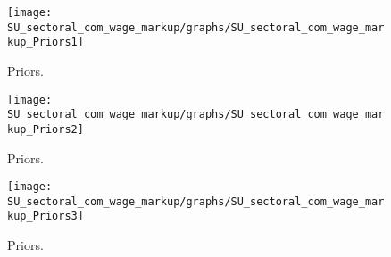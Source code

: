  
\begin{figure}[H]
\centering
\texttt{[image: SU\_sectoral\_com\_wage\_markup/graphs/SU\_sectoral\_com\_wage\_markup\_Priors1]}
\caption{Priors.}\label{Fig:Priors:1}
\end{figure}
\begin{figure}[H]
\centering
\texttt{[image: SU\_sectoral\_com\_wage\_markup/graphs/SU\_sectoral\_com\_wage\_markup\_Priors2]}
\caption{Priors.}\label{Fig:Priors:2}
\end{figure}
\begin{figure}[H]
\centering
\texttt{[image: SU\_sectoral\_com\_wage\_markup/graphs/SU\_sectoral\_com\_wage\_markup\_Priors3]}
\caption{Priors.}\label{Fig:Priors:3}
\end{figure}
 

